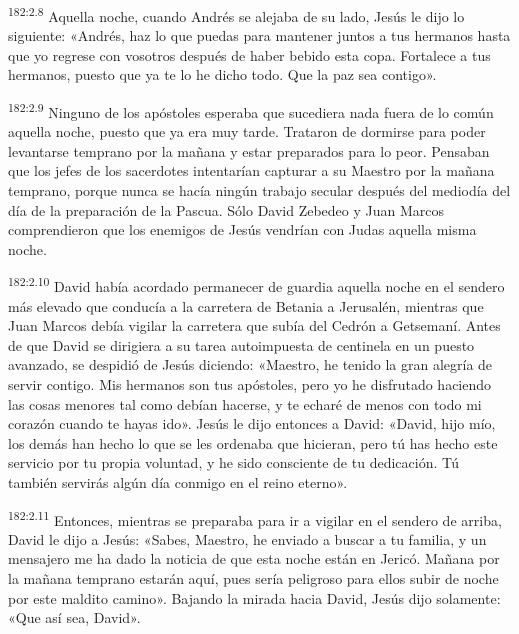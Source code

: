\par 
\textsuperscript{182:2.8} Aquella noche, cuando Andrés se alejaba de su lado, Jesús le dijo lo siguiente: «Andrés, haz lo que puedas para mantener juntos a tus hermanos hasta que yo regrese con vosotros después de haber bebido esta copa. Fortalece a tus hermanos, puesto que ya te lo he dicho todo. Que la paz sea contigo».

\par 
\textsuperscript{182:2.9} Ninguno de los apóstoles esperaba que sucediera nada fuera de lo común aquella noche, puesto que ya era muy tarde. Trataron de dormirse para poder levantarse temprano por la mañana y estar preparados para lo peor. Pensaban que los jefes de los sacerdotes intentarían capturar a su Maestro por la mañana temprano, porque nunca se hacía ningún trabajo secular después del mediodía del día de la preparación de la Pascua. Sólo David Zebedeo y Juan Marcos comprendieron que los enemigos de Jesús vendrían con Judas aquella misma noche.

\par 
\textsuperscript{182:2.10} David había acordado permanecer de guardia aquella noche en el sendero más elevado que conducía a la carretera de Betania a Jerusalén, mientras que Juan Marcos debía vigilar la carretera que subía del Cedrón a Getsemaní. Antes de que David se dirigiera a su tarea autoimpuesta de centinela en un puesto avanzado, se despidió de Jesús diciendo: «Maestro, he tenido la gran alegría de servir contigo. Mis hermanos son tus apóstoles, pero yo he disfrutado haciendo las cosas menores tal como debían hacerse, y te echaré de menos con todo mi corazón cuando te hayas ido». Jesús le dijo entonces a David: «David, hijo mío, los demás han hecho lo que se les ordenaba que hicieran, pero tú has hecho este servicio por tu propia voluntad, y he sido consciente de tu dedicación. Tú también servirás algún día conmigo en el reino eterno».

\par 
\textsuperscript{182:2.11} Entonces, mientras se preparaba para ir a vigilar en el sendero de arriba, David le dijo a Jesús: «Sabes, Maestro, he enviado a buscar a tu familia, y un mensajero me ha dado la noticia de que esta noche están en Jericó. Mañana por la mañana temprano estarán aquí, pues sería peligroso para ellos subir de noche por este maldito camino». Bajando la mirada hacia David, Jesús dijo solamente: «Que así sea, David».

